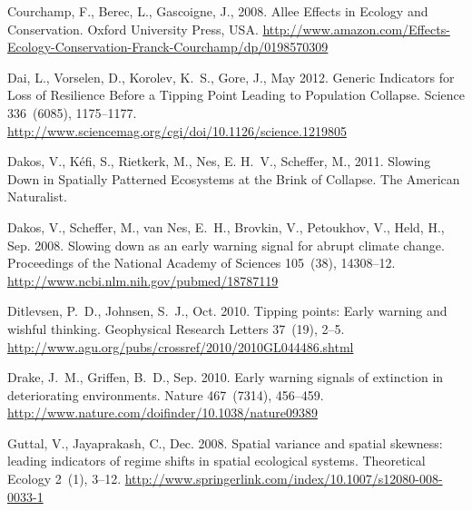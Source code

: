 \documentclass[authoryear,review,12pt]{elsarticle}
\begin{document}
\begin{thebibliography}{24}
Courchamp, F., Berec, L., Gascoigne, J., 2008. {Allee Effects in Ecology and
  Conservation}. Oxford University Press, USA.
\newline\urlprefix\url{http://www.amazon.com/Effects-Ecology-Conservation-Franck-Courchamp/dp/0198570309}

Dai, L., Vorselen, D., Korolev, K.~S., Gore, J., May 2012. {Generic Indicators
  for Loss of Resilience Before a Tipping Point Leading to Population
  Collapse}. Science 336~(6085), 1175--1177.
\newline\urlprefix\url{http://www.sciencemag.org/cgi/doi/10.1126/science.1219805}

Dakos, V., K\'{e}fi, S., Rietkerk, M., Nes, E. H.~V., Scheffer, M., 2011.
  {Slowing Down in Spatially Patterned Ecosystems at the Brink of Collapse}.
  The American Naturalist.

Dakos, V., Scheffer, M., van Nes, E.~H., Brovkin, V., Petoukhov, V., Held, H.,
  Sep. 2008. {Slowing down as an early warning signal for abrupt climate
  change.} Proceedings of the National Academy of Sciences 105~(38), 14308--12.
\newline\urlprefix\url{http://www.ncbi.nlm.nih.gov/pubmed/18787119}

Ditlevsen, P.~D., Johnsen, S.~J., Oct. 2010. {Tipping points: Early warning and
  wishful thinking}. Geophysical Research Letters 37~(19), 2--5.
\newline\urlprefix\url{http://www.agu.org/pubs/crossref/2010/2010GL044486.shtml}

Drake, J.~M., Griffen, B.~D., Sep. 2010. {Early warning signals of extinction
  in deteriorating environments}. Nature 467~(7314), 456--459.
\newline\urlprefix\url{http://www.nature.com/doifinder/10.1038/nature09389}

Guttal, V., Jayaprakash, C., Dec. 2008. {Spatial variance and spatial skewness:
  leading indicators of regime shifts in spatial ecological systems}.
  Theoretical Ecology 2~(1), 3--12.
\newline\urlprefix\url{http://www.springerlink.com/index/10.1007/s12080-008-0033-1}


\end{thebibliography}
\end{document}
